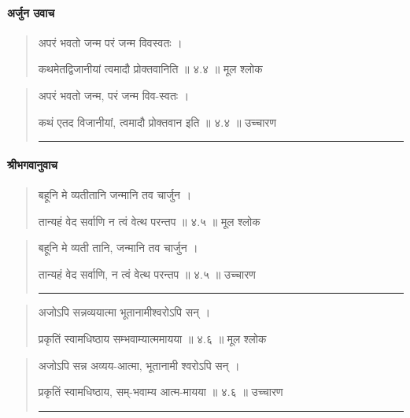 \paragraph{\sanskrit अर्जुन उवाच}
\begin{quotation}



अपरं भवतो जन्म परं जन्म विवस्वतः  ।  

कथमेतद्विजानीयां त्वमादौ प्रोक्तवानिति  ॥ ४.४ ॥  मूल श्लोक
\end{quotation}

\begin{quotation}

अपरं भवतो जन्म, परं जन्म विव-स्वतः  ।  

कथं एतद विजानीयां, त्वमादौ प्रोक्तवान इति  ॥ ४.४ ॥  उच्चारण

\noindent\rule{16cm}{0.4pt} 
\end{quotation}


\paragraph{\sanskrit श्रीभगवानुवाच} 
\begin{quotation}




बहूनि मे व्यतीतानि जन्मानि तव चार्जुन  ।  

तान्यहं वेद सर्वाणि न त्वं वेत्थ परन्तप  ॥ ४.५ ॥  मूल श्लोक
\end{quotation}

\begin{quotation}
बहूनि मे व्यती तानि, जन्मानि तव चार्जुन  ।  

तान्यहं वेद सर्वाणि, न त्वं वेत्थ परन्तप  ॥ ४.५ ॥  उच्चारण

\noindent\rule{16cm}{0.4pt} 
\end{quotation}


\begin{quotation}

अजोऽपि सन्नव्ययात्मा भूतानामीश्वरोऽपि सन्‌  ।  

प्रकृतिं स्वामधिष्ठाय सम्भवाम्यात्ममायया  ॥ ४.६ ॥  मूल श्लोक
\end{quotation}

\begin{quotation}

अजोऽपि सन्न अव्यय-आत्मा, भूतानामी श्वरोऽपि सन्‌  ।  

प्रकृतिं स्वामधिष्ठाय, सम्-भवाम्य आत्म-मायया  ॥ ४.६ ॥  उच्चारण

\noindent\rule{16cm}{0.4pt} 
\end{quotation}


